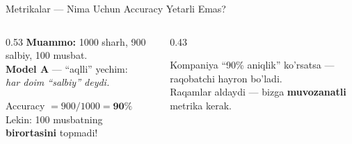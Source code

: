 \documentclass[aspectratio=169,11pt]{beamer}
\begin{document}
\begin{frame}{Metrikalar --- Nima Uchun Accuracy Yetarli Emas?}
  \begin{columns}[T]
    \begin{column}{0.53\textwidth}
      \small
      \textbf{Muammo:} 1000 sharh, 900 salbiy, 100 musbat.\\[6pt]
      \textbf{Model A} --- ``aqlli'' yechim:\\
      \textit{har doim ``salbiy'' deydi.}\\[5pt]
      \begin{tcolorbox}[warnbox]
        \small
        Accuracy $= 900/1000 = \mathbf{90\%}$\\[2pt]
        Lekin: 100 musbatning
        \textbf{birortasini} topmadi!
      \end{tcolorbox}
    \end{column}
    \begin{column}{0.43\textwidth}
      \vspace{8pt}
      \begin{tcolorbox}[defbox,title=Muammo]
        \small
        Kompaniya ``90\% aniqlik''
        ko'rsatsa --- raqobatchi
        hayron bo'ladi.\\[4pt]
        Raqamlar aldaydi ---
        bizga \textbf{muvozanatli}
        metrika kerak.
      \end{tcolorbox}
    \end{column}
  \end{columns}
\end{frame}
\end{document}
